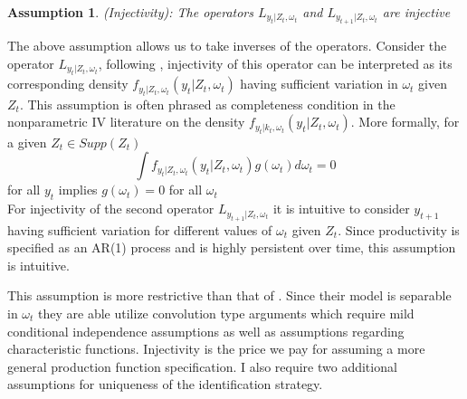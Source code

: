 \documentclass{article}
\newtheorem{assump}{Assumption}[section]
\begin{document}
\begin{assump} \label{injectivity} (Injectivity): The operators $L_{y_{t}|Z_{t}, \omega_{t}}$ and $L_{y_{t+1}|Z_{t}, \omega_{t}}$ are injective
\end{assump}

The above assumption allows us to take inverses of the operators. Consider the operator $L_{y_{t}|Z_{t}, \omega_{t}}$, following \cite{Hu2008}, injectivity of this operator can be interpreted as its corresponding density $f_{y_{t}|Z_{t}, \omega_{t}}(y_{t}|Z_{t}, \omega_{t})$ having sufficient variation in $\omega_{t}$ given $Z_{t}$. This assumption is often phrased as completeness condition in the nonparametric IV literature on the density $f_{y_{t}|k_{t}, \omega_{t}}(y_{t}|Z_{t}, \omega_{t})$. More formally, for a given $Z_{t}\in Supp(Z_{t})$
\begin{equation}
\int f_{y_{t}|Z_{t}, \omega_{t}}(y_{t}|Z_{t}, \omega_{t})g(\omega_{t})d\omega_{t}=0
\end{equation}
for all $y_{t}$ implies $g(\omega_{t})=0$ for all $\omega_{t}$\\

For injectivity of the second operator $L_{y_{t+1}|Z_{t}, \omega_{t}}$ it is intuitive to consider $y_{t+1}$ having sufficient variation for different values of $\omega_{t}$ given $Z_{t}$. Since productivity is specified as an AR(1) process and is highly persistent over time, this assumption is intuitive. 

This assumption is more restrictive than that of \cite{Hu2019}. Since their model is separable in $\omega_{t}$ they are able utilize convolution type arguments which require mild conditional independence assumptions as well as assumptions regarding characteristic functions. Injectivity is the price we pay for assuming a more general production function specification. I also require two additional assumptions for uniqueness of the identification strategy.
\end{document}
